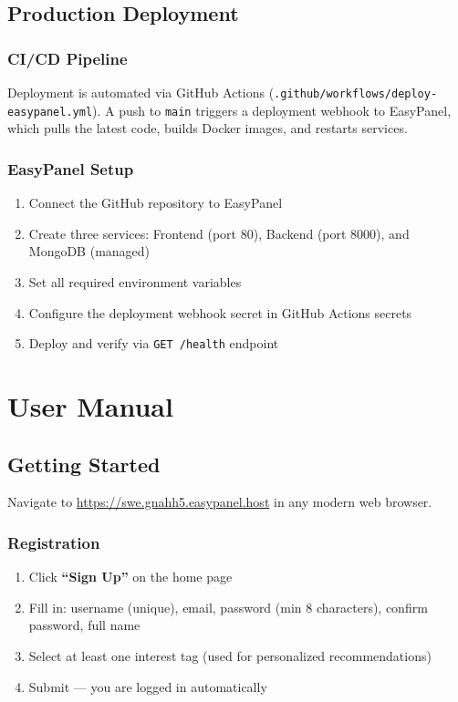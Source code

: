 \documentclass[10pt,a4paper]{report}
\begin{document}
\section{Production Deployment}

\subsection{CI/CD Pipeline}

Deployment is automated via GitHub Actions (\texttt{.github/workflows/deploy-easypanel.yml}). A push to \texttt{main} triggers a deployment webhook to EasyPanel, which pulls the latest code, builds Docker images, and restarts services.

\subsection{EasyPanel Setup}

\begin{enumerate}
    \item Connect the GitHub repository to EasyPanel
    \item Create three services: Frontend (port 80), Backend (port 8000), and MongoDB (managed)
    \item Set all required environment variables
    \item Configure the deployment webhook secret in GitHub Actions secrets
    \item Deploy and verify via \texttt{GET /health} endpoint
\end{enumerate}

\chapter{User Manual}

\section{Getting Started}

Navigate to \url{https://swe.gnahh5.easypanel.host} in any modern web browser.

\subsection{Registration}

\begin{enumerate}
    \item Click \textbf{``Sign Up''} on the home page
    \item Fill in: username (unique), email, password (min 8 characters), confirm password, full name
    \item Select at least one interest tag (used for personalized recommendations)
    \item Submit --- you are logged in automatically
\end{enumerate}
\end{document}
